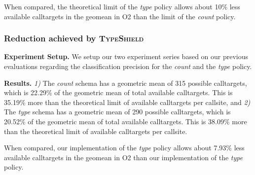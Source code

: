 When compared, the theoretical limit of the \textit{type} policy allows about 10\% less available calltargets in the geomean in O2 than the limit of the \textit{count} policy.

\subsubsection{Reduction achieved by \textsc{TypeShield}}
\label{subsection:typeshieldvslimitcount}
\textbf{Experiment Setup.} We setup our two experiment series based on our previous evaluations regarding the classification precision for the \textit{count} and the \textit{type} policy.

\textbf{Results.}
\textit{1)}  The \textit{count} schema has a geometric mean of 315 possible calltargets, which is 22.29\% of the geometric mean of total available 
calltargets. This is 35.19\% more than the theoretical limit of available calltargets per callsite, and
\textit{2)}  The \textit{type} schema has a geometric mean of 290 possible calltargets, which is 20.52\% of the geometric mean of total available
calltargets. This is 38.09\% more than the theoretical limit of available calltargets per callsite.

When compared, our implementation of the \textit{type} policy allows about 7.93\% less available calltargets in the geomean in O2 than our implementation of the \textit{type} policy.


